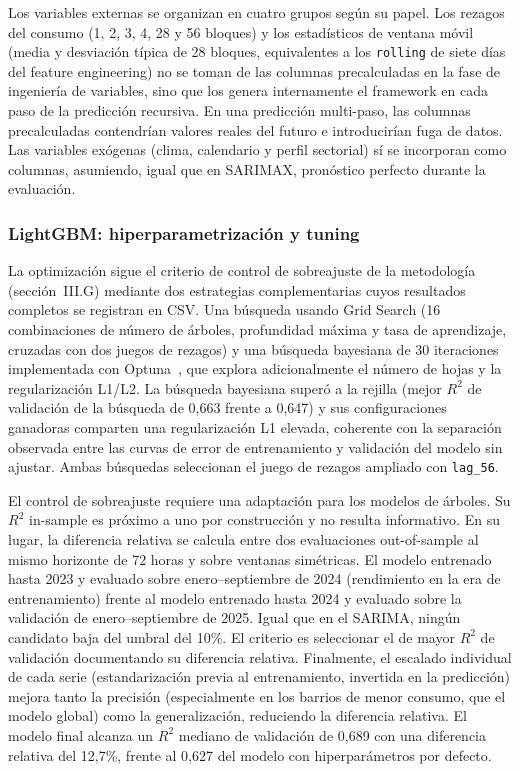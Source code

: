 \documentclass[12pt, a4paper]{article}
\begin{document}
Los variables externas se organizan en cuatro grupos según su papel. Los rezagos del consumo (1, 2, 3, 4, 28 y 56 bloques) y los estadísticos de ventana móvil (media y desviación típica de 28 bloques, equivalentes a los \texttt{rolling} de siete días del feature engineering) no se toman de las columnas precalculadas en la fase de ingeniería de variables, sino que los genera internamente el framework en cada paso de la predicción recursiva. En una predicción multi-paso, las columnas precalculadas contendrían valores reales del futuro e introducirían fuga de datos. Las variables exógenas (clima, calendario y perfil sectorial) sí se incorporan como columnas, asumiendo, igual que en SARIMAX, pronóstico perfecto durante la evaluación.

\subsubsection{LightGBM: hiperparametrización y tuning}

La optimización sigue el criterio de control de sobreajuste de la metodología (sección~III.G) mediante dos estrategias complementarias cuyos resultados completos se registran en CSV. Una búsqueda usando Grid Search (16 combinaciones de número de árboles, profundidad máxima y tasa de aprendizaje, cruzadas con dos juegos de rezagos) y una búsqueda bayesiana de 30 iteraciones implementada con Optuna~\cite{optuna2019}, que explora adicionalmente el número de hojas y la regularización L1/L2. La búsqueda bayesiana superó a la rejilla (mejor $R^2$ de validación de la búsqueda de 0,663 frente a 0,647) y sus configuraciones ganadoras comparten una regularización L1 elevada, coherente con la separación observada entre las curvas de error de entrenamiento y validación del modelo sin ajustar. Ambas búsquedas seleccionan el juego de rezagos ampliado con \texttt{lag\_56}.

El control de sobreajuste requiere una adaptación para los modelos de árboles. Su $R^2$ in-sample es próximo a uno por construcción y no resulta informativo. En su lugar, la diferencia relativa se calcula entre dos evaluaciones out-of-sample al mismo horizonte de 72 horas y sobre ventanas simétricas. El modelo entrenado hasta 2023 y evaluado sobre enero--septiembre de 2024 (rendimiento en la era de entrenamiento) frente al modelo entrenado hasta 2024 y evaluado sobre la validación de enero--septiembre de 2025. Igual que en el SARIMA, ningún candidato baja del umbral del 10\%. El criterio es seleccionar el de mayor $R^2$ de validación documentando su diferencia relativa. Finalmente, el escalado individual de cada serie (estandarización previa al entrenamiento, invertida en la predicción) mejora tanto la precisión (especialmente en los barrios de menor consumo, que el modelo global) como la generalización, reduciendo la diferencia relativa. El modelo final alcanza un $R^2$ mediano de validación de 0,689 con una diferencia relativa del 12,7\%, frente al 0,627 del modelo con hiperparámetros por defecto.
\end{document}
